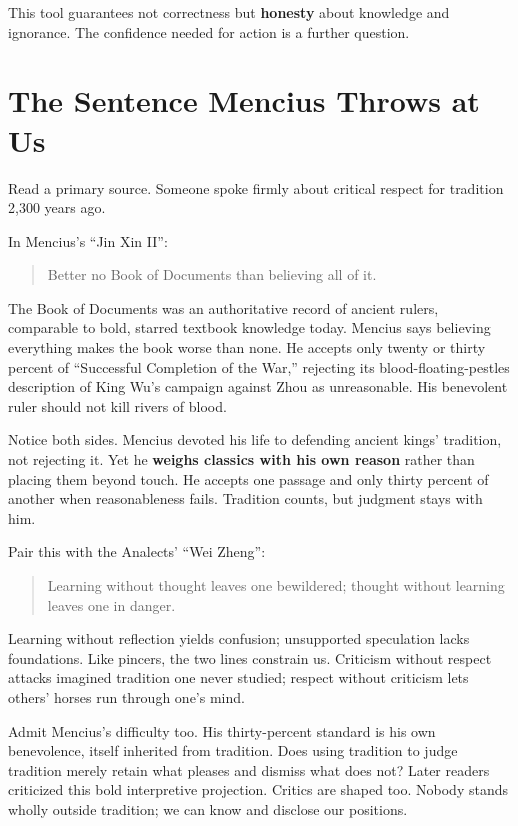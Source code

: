This tool guarantees not correctness but \textbf{honesty} about knowledge and ignorance. The confidence needed for action is a further question.

\section{The Sentence Mencius Throws at Us}
Read a primary source. Someone spoke firmly about critical respect for tradition 2,300 years ago.

In Mencius's ``Jin Xin II'':

\begin{quote}
Better no Book of Documents than believing all of it.
\end{quote}
The Book of Documents was an authoritative record of ancient rulers, comparable to bold, starred textbook knowledge today. Mencius says believing everything makes the book worse than none. He accepts only twenty or thirty percent of ``Successful Completion of the War,'' rejecting its blood-floating-pestles description of King Wu's campaign against Zhou as unreasonable. His benevolent ruler should not kill rivers of blood.

Notice both sides. Mencius devoted his life to defending ancient kings' tradition, not rejecting it. Yet he \textbf{weighs classics with his own reason} rather than placing them beyond touch. He accepts one passage and only thirty percent of another when reasonableness fails. Tradition counts, but judgment stays with him.

Pair this with the Analects' ``Wei Zheng'':

\begin{quote}
Learning without thought leaves one bewildered; thought without learning leaves one in danger.
\end{quote}
Learning without reflection yields confusion; unsupported speculation lacks foundations. Like pincers, the two lines constrain us. Criticism without respect attacks imagined tradition one never studied; respect without criticism lets others' horses run through one's mind.

Admit Mencius's difficulty too. His thirty-percent standard is his own benevolence, itself inherited from tradition. Does using tradition to judge tradition merely retain what pleases and dismiss what does not? Later readers criticized this bold interpretive projection. Critics are shaped too. Nobody stands wholly outside tradition; we can know and disclose our positions.

